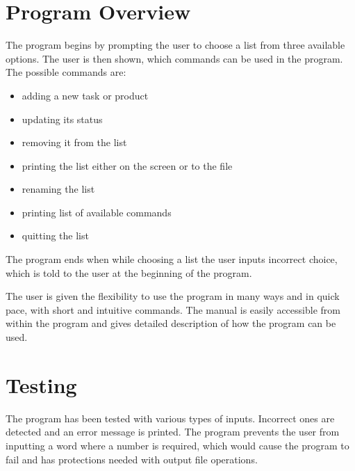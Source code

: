 \documentclass{article}
\begin{document}
\section{Program Overview}

The program begins by prompting the user to choose a list from three available options. The user is then shown, which commands can be used in the program. The possible commands are:
\begin{itemize}
\item adding a new task or product
\item updating its status
\item removing it from the list
\item printing the list either on the screen or to the file
\item renaming the list
\item printing list of available commands
\item quitting the list
\end{itemize}
The program ends when while choosing a list the user inputs incorrect choice, which is told to the user at the beginning of the program.

The user is given the flexibility to use the program in many ways and in quick pace, with short and intuitive commands. The manual is easily accessible from within the program and gives detailed description of how the program can be used.

\section{Testing}

The program has been tested with various types of inputs. Incorrect ones are detected and an error message is printed. The program prevents the user from inputting a word where a number is required, which would cause the program to fail and has protections needed with output file operations.
\end{document}
